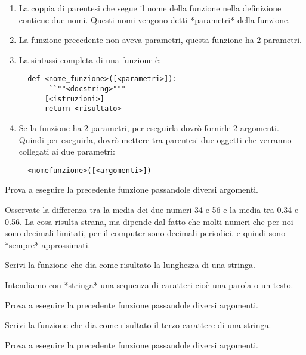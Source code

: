 \begin{osservazione}
 \begin{enumerate} [nosep]
  \item La coppia di parentesi che segue il nome della funzione nella 
definizione contiene due nomi. Questi nomi vengono detti *parametri* della 
funzione.
  \item La funzione precedente non aveva parametri, questa funzione ha 2 
parametri.
  \item La sintassi completa di una funzione è:
\begin{lstlisting}
  def <nome_funzione>([<parametri>]):
       ``""<docstring>"""
      [<istruzioni>]
      return <risultato>
\end{lstlisting}
  \item Se la funzione ha 2 parametri, per eseguirla dovrò fornirle 2 
argomenti. 
Quindi per eseguirla, dovrò mettere tra parentesi due oggetti che verranno 
collegati ai due parametri:
\begin{lstlisting}
  <nomefunzione>([<argomenti>])
\end{lstlisting}
 \end{enumerate}
\end{osservazione}

Prova a eseguire la precedente funzione passandole diversi argomenti.

\begin{osservazione}
Osservate la differenza tra la media dei due numeri 34 e 56 e la media 
tra 0.34 e 0.56. La cosa risulta strana, ma dipende dal fatto che molti 
numeri che per noi sono decimali limitati, per il computer sono decimali 
periodici. e quindi sono *sempre* approssimati.
\end{osservazione}

\begin{esempio}
Scrivi la funzione che dia come risultato la lunghezza di una stringa.

\begin{osservazione}
Intendiamo con *stringa* una sequenza di caratteri cioè una parola o 
un testo.
\end{osservazione}


Prova a eseguire la precedente funzione passandole diversi argomenti.
\end{esempio}

\begin{esempio}
Scrivi la funzione che dia come risultato il terzo carattere di una 
stringa.


Prova a eseguire la precedente funzione passandole diversi argomenti.
\end{esempio}

